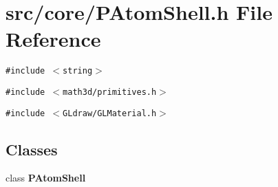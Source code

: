 \section{src/core/PAtom\-Shell.h File Reference}
\label{PAtomShell_8h}


{\tt \#include $<$string$>$}\par
{\tt \#include $<$math3d/primitives.h$>$}\par
{\tt \#include $<$GLdraw/GLMaterial.h$>$}\par
\subsection*{Classes}
\begin{CompactItemize}
\item 
class {\bf PAtom\-Shell}
\end{CompactItemize}
